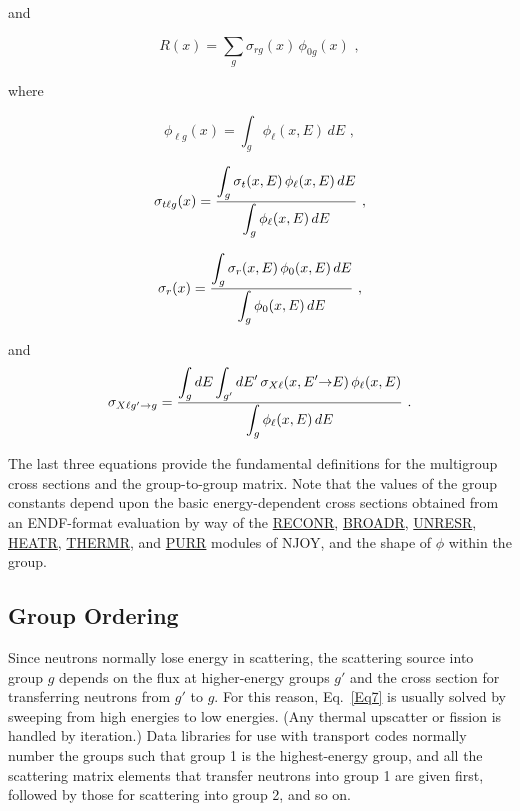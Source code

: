 \noindent
and

  \begin{equation}
    R(x)=\sum_g\sigma_{rg}(x)\,\phi_{0g}(x)\,\,,
  \end{equation}

\noindent
where

  \begin{equation}
    \phi_{\ell g}(x)=\int_g\phi_{\ell}(x,E)\,dE\,\,,
  \end{equation}

  \begin{equation}
    \sigma_{t\ell g}(x)={\displaystyle{\int_g
    \sigma_t(x,E)\,\phi_{\ell}(x,E)\,dE}
    \over\displaystyle {\int_g\phi_{\ell}(x,E)\,dE}}\,\,,
  \label{Eq10}
  \end{equation}

  \begin{equation}
    \sigma_r(x)={\displaystyle{\int_g\sigma_r(x,E)\,\phi_0(x,E)\,dE}
    \over\displaystyle {\int_g\phi_0(x,E)\,dE}}\,\,,
  \label{Eq11}
  \end{equation}

\noindent
and
  \begin{equation}
    \sigma_{X\ell g'\rightarrow g}={\displaystyle{\int_gdE\int_{g'}
    dE'\,\sigma_{X\ell}(x,E'{\rightarrow}E)\,\phi_{\ell}(x,E)}
    \over \displaystyle{\int_g\phi_{\ell}(x,E)\,dE}}\,\,.
  \label{Eq12}
  \end{equation}

The last three equations provide the fundamental definitions for the
multigroup cross sections and the
group-to-group matrix.  Note that
the values of the group constants depend upon the basic energy-dependent
cross sections obtained from an ENDF-format evaluation by way of
the \hyperlink{sRECONRhy}{RECONR},
\hyperlink{sBROADRhy}{BROADR},
\hyperlink{sUNRESRhy}{UNRESR},
\hyperlink{sHEATRhy}{HEATR},
\hyperlink{sTHERMRhy}{THERMR},
and \hyperlink{sPURRhy}{PURR} modules
of NJOY, and the shape of $\phi$ within the group.

\subsection{Group Ordering}
\label{ssGROUPR_Group_Order}

Since neutrons normally lose energy in scattering, the scattering source
into group $g$ depends on the flux at higher-energy groups $g'$ and the
cross section for transferring neutrons from $g'$ to $g$.  For this
reason, Eq.~\ref{Eq7} is usually solved by sweeping from high energies
to low energies.  (Any thermal upscatter or fission is handled by
iteration.)  Data libraries for use with transport codes normally number
the groups such that group 1 is the highest-energy group, and all the
scattering matrix elements that transfer neutrons into group 1 are given
first, followed by those for scattering into group 2, and so on.

